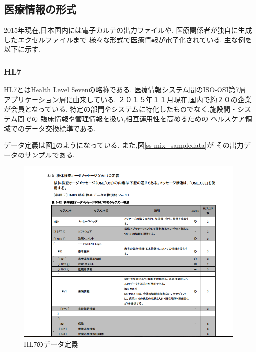 \subsection{医療情報の形式}
  2015年現在,日本国内には電子カルテの出力ファイルや,
  医療関係者が独自に生成したエクセルファイルまで
  様々な形式で医療情報が電子化されている.
  主な例を以下に示す.

  \subsubsection{HL7}
  HL7とはHealth Level Sevenの略称である.
  医療情報システム間のISO-OSI第7層アプリケーション層に由来している.
  ２０１５年１１月現在,国内で約２０の企業が会員となっている.
  特定の部門やシステムに特化したものでなく,施設間・システム間での
  臨床情報や管理情報を扱い,相互運用性を高めるための
  ヘルスケア領域でのデータ交換標準である.\cite{bibi5} \cite{bibi6}

  データ定義は図\ref{ss-mix_sample}のようになっている.
  また,図\ref{ss-mix_sampledata}が
  その出力データのサンプルである.

	\begin{figure}[htbp]
    \begin{center}
			\includegraphics[width=18cm, bb=0 0 792 630]{./gazou/ss-mix_sample.png} %
    \end{center}
    \caption{HL7のデータ定義}
		\label{ss-mix_sample}
	\end{figure}

